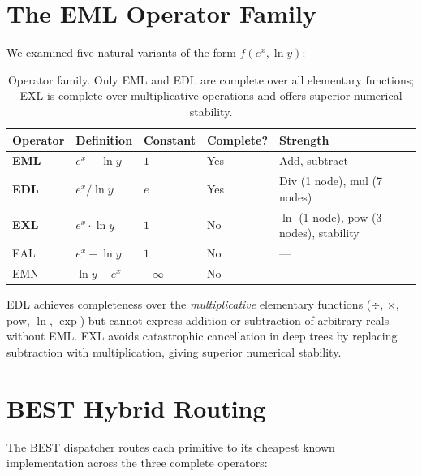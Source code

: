 \documentclass[11pt,a4paper]{article}
\begin{document}
\section{The EML Operator Family}

We examined five natural variants of the form $f(e^x, \ln y)$:

\begin{table}[h]
\centering
\begin{tabular}{@{}lllll@{}}
\toprule
Operator & Definition & Constant & Complete? & Strength \\
\midrule
\textbf{EML} & $e^x - \ln y$ & $1$ & Yes & Add, subtract \\
\textbf{EDL} & $e^x / \ln y$ & $e$ & Yes & Div (1 node), mul (7 nodes) \\
\textbf{EXL} & $e^x \cdot \ln y$ & $1$ & No  & $\ln$ (1 node), $\mathrm{pow}$ (3 nodes), stability \\
EAL          & $e^x + \ln y$ & $1$ & No  & --- \\
EMN          & $\ln y - e^x$ & $-\infty$ & No & --- \\
\bottomrule
\end{tabular}
\caption{Operator family.  Only EML and EDL are complete over all
elementary functions; EXL is complete over multiplicative operations
and offers superior numerical stability.}
\end{table}

EDL achieves completeness over the \emph{multiplicative} elementary
functions ($\div$, $\times$, $\mathrm{pow}$, $\ln$, $\exp$) but cannot
express addition or subtraction of arbitrary reals without EML.
EXL avoids catastrophic cancellation in deep trees by replacing
subtraction with multiplication, giving superior numerical stability.

\section{BEST Hybrid Routing}
\label{sec:best}

The \textsc{BEST} dispatcher routes each primitive to its cheapest
known implementation across the three complete operators:
\end{document}
